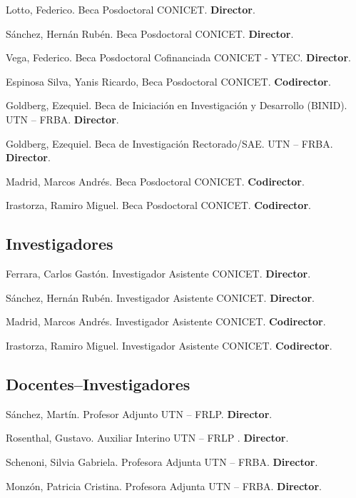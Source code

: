      Lotto, Federico. Beca Posdoctoral CONICET. \textbf{Director}.

     Sánchez, Hernán Rubén. Beca Posdoctoral CONICET. \textbf{Director}.

     Vega, Federico. Beca Posdoctoral Cofinanciada CONICET - YTEC. \textbf{Director}.

     Espinosa Silva, Yanis Ricardo, Beca Posdoctoral CONICET. \textbf{Codirector}.

     Goldberg, Ezequiel. Beca de Iniciación en Investigación y Desarrollo (BINID). UTN -- FRBA. \textbf{Director}.

     Goldberg, Ezequiel. Beca de Investigación Rectorado/SAE. UTN -- FRBA. \textbf{Director}.

     Madrid, Marcos Andrés. Beca Posdoctoral CONICET. \textbf{Codirector}.

     Irastorza, Ramiro Miguel. Beca Posdoctoral CONICET. \textbf{Codirector}.

\subsection{Investigadores}
 Ferrara, Carlos Gastón. Investigador Asistente CONICET. \textbf{Director}.

 Sánchez, Hernán Rubén. Investigador Asistente CONICET. \textbf{Director}.

     Madrid, Marcos Andrés. Investigador Asistente CONICET. \textbf{Codirector}.

     Irastorza, Ramiro Miguel. Investigador Asistente CONICET. \textbf{Codirector}.
  
\subsection{Docentes--Investigadores}
 Sánchez, Martín. Profesor Adjunto UTN -- FRLP. \textbf{Director}.
  
   Rosenthal, Gustavo. Auxiliar Interino UTN -- FRLP . \textbf{Director}.
  
   Schenoni, Silvia Gabriela. Profesora Adjunta UTN -- FRBA. \textbf{Director}.
  
   Monzón, Patricia Cristina. Profesora Adjunta UTN -- FRBA. \textbf{Director}.
  

